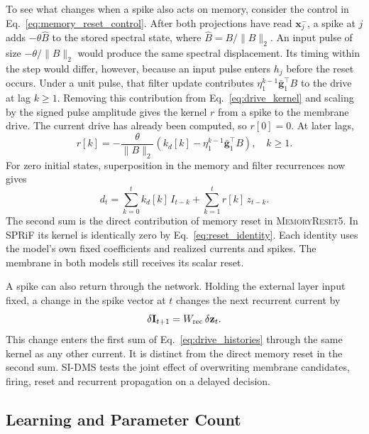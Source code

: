 \documentclass[letterpaper,journal]{IEEEtran}
\newcommand{\mr}{\textnormal{\textsc{MemoryReset5}}}
\begin{document}
To see what changes when a spike also acts on memory, consider the control in Eq.~\eqref{eq:memory_reset_control}. After both projections have read $\mathbf x_j^-$, a spike at $j$ adds $-\theta\widehat B$ to the stored spectral state, where $\widehat B=B/\|B\|_2$. An input pulse of size $-\theta/\|B\|_2$ would produce the same spectral displacement. Its timing within the step would differ, however, because an input pulse enters $h_j$ before the reset occurs. Under a unit pulse, that filter update contributes $\eta_1^{k-1}\bar{\mathbf g}_1^\top B$ to the drive at lag $k\geq1$. Removing this contribution from Eq.~\eqref{eq:drive_kernel} and scaling by the signed pulse amplitude gives the kernel $r$ from a spike to the membrane drive. The current drive has already been computed, so $r[0]=0$. At later lags,
\begin{equation}
r[k]=-\frac{\theta}{\|B\|_2}
\left(k_d[k]-\eta_1^{k-1}\bar{\mathbf g}_1^\top B\right),
\quad k\geq1 .
\label{eq:reset_kernel}
\end{equation}
For zero initial states, superposition in the memory and filter recurrences now gives
\begin{equation}
d_t=\sum_{k=0}^{t} k_d[k]\,I_{t-k}
    +\sum_{k=1}^{t} r[k]\,z_{t-k}.
\label{eq:drive_histories}
\end{equation}
The second sum is the direct contribution of memory reset in \mr{}. In SPRiF its kernel is identically zero by Eq.~\eqref{eq:reset_identity}. Each identity uses the model's own fixed coefficients and realized currents and spikes. The membrane in both models still receives its scalar reset.

A spike can also return through the network. Holding the external layer input fixed, a change in the spike vector at $t$ changes the next recurrent current by
\begin{equation}
\delta\mathbf I_{t+1}=W_{\rm rec}\,\delta\mathbf z_t .
\label{eq:recurrent_feedback}
\end{equation}
This change enters the first sum of Eq.~\eqref{eq:drive_histories} through the same kernel as any other current. It is distinct from the direct memory reset in the second sum. SI-DMS tests the joint effect of overwriting membrane candidates, firing, reset and recurrent propagation on a delayed decision.

\subsection{Learning and Parameter Count}
\label{sec:learning}
\end{document}
